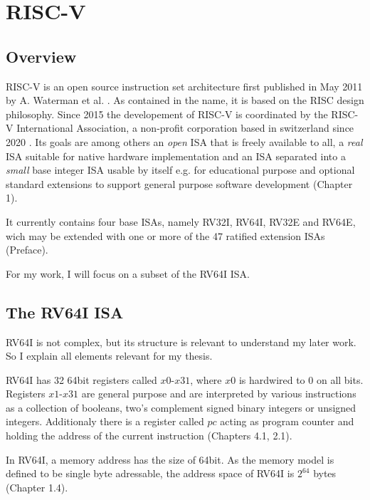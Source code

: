 \chapter{RISC-V}\label{chap:riscv}

\section{Overview}

RISC-V is an open source instruction set architecture first published in May 2011 by A. Waterman et al. \cite{first_riscv}.
As contained in the name, it is based on the RISC design philosophy. 
Since 2015 the developement of RISC-V is coordinated by the RISC-V International Association, a non-profit corporation based in switzerland since 2020 \cite{riscvorg}.
Its goals are among others an \emph{open} ISA that is freely available to all,
a \emph{real} ISA suitable for native hardware implementation and
an ISA separated into a \emph{small} base integer ISA usable by itself e.g. for educational purpose
and optional standard extensions to support general purpose software development \cite{riscv-isa}(Chapter 1).

It currently contains four base ISAs, namely RV32I, RV64I, RV32E and RV64E,
wich may be extended with one or more of the 47 ratified extension ISAs \cite{riscv-isa} (Preface).

 

For my work, I will focus on a subset of the RV64I ISA.

\section{The RV64I ISA}
RV64I is not complex, but its structure is relevant to understand my later work.
So I explain all elements relevant for my thesis.

RV64I has 32 64bit registers called $x0$-$x31$, where $x0$ is hardwired to 0 on all bits.
Registers $x1$-$x31$ are general purpose and are interpreted by various instructions as a collection of booleans, two's complement signed binary integers or unsigned integers.
Additionaly there is a register called $pc$ acting as program counter and holding the address of the current instruction \cite{riscv-isa}(Chapters 4.1, 2.1).

In RV64I, a memory address has the size of 64bit. As the memory model is defined to be single byte adressable,
the address space of RV64I is $2^{64}$ bytes \cite{riscv-isa}(Chapter 1.4).

